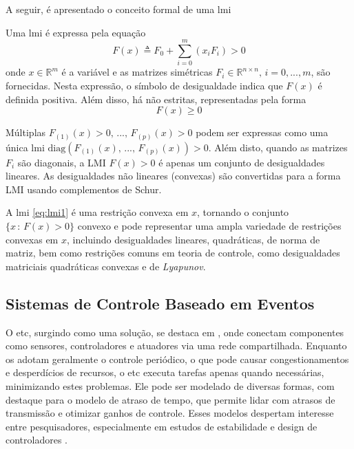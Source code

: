 A seguir, é apresentado o conceito formal de uma \acrshort{lmi}

\begin{definition}
  Uma \acrshort{lmi} é expressa pela equação \begin{equation} F(x) \triangleq F_0 + \sum_{i=0}^{m}(x_iF_i) > 0 \label{eq:lmi1}\end{equation} onde $x \in \mathbb{R}^m$ é a variável e as matrizes simétricas $F_i \in \mathbb{R}^{n \times n}, \, i = 0, . . . , m$, são fornecidas. Nesta expressão, o símbolo de desigualdade indica que $F(x)$ é definida positiva. Além disso, há  não estritas, representadas pela forma \begin{equation} F(x) \geq 0 \end{equation}
\end{definition}

Múltiplas   $F_{(1)}(x) > 0, \, ..., \, F_{(p)}(x) > 0$ podem ser expressas como uma única \acrshort{lmi} $\mathrm{diag}(F_{(1)}(x), \, ..., \, F_{(p)}(x)) > 0$. Além disto, quando as matrizes $F_i$ são diagonais, a LMI $F(x) > 0$ é apenas um conjunto de desigualdades lineares. As desigualdades não lineares (convexas) são convertidas para a forma LMI usando complementos de Schur.

A \acrshort{lmi} \eqref{eq:lmi1} é uma restrição convexa em $x$, tornando o conjunto $\{x \, : \, F(x) > 0\}$ convexo e pode representar uma ampla variedade de restrições convexas em $x$, incluindo desigualdades lineares, quadráticas, de norma de matriz, bem como restrições comuns em teoria de controle, como desigualdades matriciais quadráticas convexas e de \textit{Lyapunov}.

\subsection{Sistemas de Controle Baseado em Eventos} \label{subsection:etc}

O \acrfull{etc}, surgindo como uma solução, se destaca em , onde conectam componentes como sensores, controladores e atuadores via uma rede compartilhada. Enquanto os  adotam geralmente o controle periódico, o que pode causar congestionamentos e desperdícios de recursos, o \acrshort{etc} executa tarefas apenas quando necessárias, minimizando estes problemas. Ele pode ser modelado de diversas formas, com destaque para o modelo de atraso de tempo, que permite lidar com atrasos de transmissão e otimizar ganhos de controle. Esses modelos despertam interesse entre pesquisadores, especialmente em estudos de estabilidade e design de controladores \citep{peng2018}.

